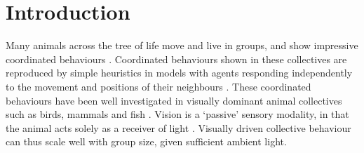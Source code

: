 \documentclass[
]{book}
\begin{document}
\newpage

\hypertarget{introduction-2}{%
\section{Introduction}\label{introduction-2}}

Many animals across the tree of life move and live in groups, and show impressive coordinated behaviours \citep{sumpter2006a}. Coordinated behaviours shown in these collectives are reproduced by simple heuristics in models with agents responding independently to the movement and positions of their neighbours \citep{couzin2002a}. These coordinated behaviours have been well investigated in visually dominant animal collectives such as birds, mammals and fish \citep{ballerini2008a, strandburg2013visual, pita2016collective}. Vision is a `passive' sensory modality, in that the animal acts solely as a receiver of light \citep{nelson2006a}. Visually driven collective behaviour can thus scale well with group size, given sufficient ambient light.
\end{document}

